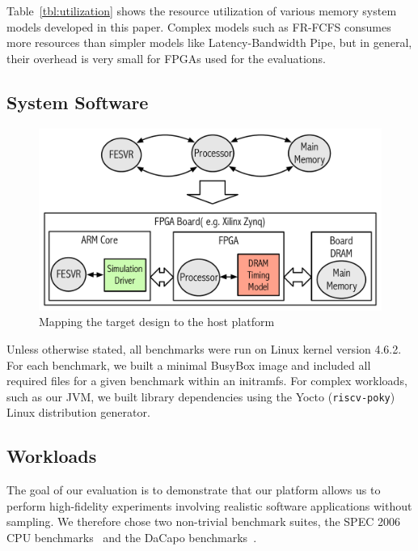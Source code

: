 Table~\ref{tbl:utilization} shows the resource utilization of various memory system models
developed in this paper. Complex models such as FR-FCFS consumes more resources than simpler
models like Latency-Bandwidth Pipe, but in general, their overhead is very small for FPGAs
used for the evaluations.

\subsection{System Software}

\begin{figure}
	\centering
	\includegraphics[width=\columnwidth]{figures/platform.pdf}
	\caption{Mapping the target design to the host platform}
	\label{fig:platform}
\end{figure}

Unless otherwise stated, all benchmarks were run on Linux kernel version 4.6.2. For each benchmark, we built a minimal BusyBox image and included all required files for a given benchmark within an initramfs. For complex workloads, such as our JVM, we built library dependencies using the Yocto (\texttt{riscv-poky}) Linux distribution generator.


\subsection{Workloads}

The goal of our evaluation is to demonstrate that our platform allows us to perform high-fidelity
experiments involving realistic software applications without sampling. We therefore chose two
non-trivial benchmark suites, the SPEC 2006 CPU benchmarks~\cite{spec_cpu_2006} and the DaCapo
benchmarks~\cite{dacapo}.


